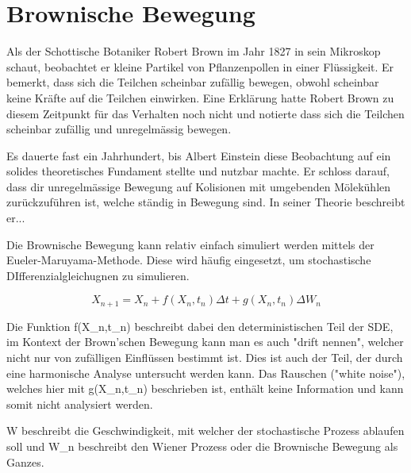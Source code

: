 %
%
%
%
\section{Brownische Bewegung\label{brown:section:teil0}}

Als der Schottische Botaniker Robert Brown im Jahr 1827 in sein Mikroskop schaut, beobachtet er kleine Partikel von Pflanzenpollen in einer Flüssigkeit. Er bemerkt, dass sich die Teilchen scheinbar zufällig bewegen, obwohl scheinbar keine Kräfte auf die Teilchen einwirken. Eine Erklärung hatte Robert Brown zu diesem Zeitpunkt für das Verhalten noch nicht und notierte dass sich die Teilchen scheinbar zufällig und unregelmässig bewegen.

Es dauerte fast ein Jahrhundert, bis Albert Einstein diese Beobachtung auf ein solides theoretisches Fundament stellte und nutzbar machte. Er schloss darauf, dass dir unregelmässige Bewegung auf Kolisionen mit umgebenden Mölekühlen zurückzuführen ist, welche ständig in Bewegung sind. In seiner Theorie beschreibt er...

Die Brownische Bewegung kann relativ einfach simuliert werden mittels der Eueler-Maruyama-Methode. Diese wird häufig eingesetzt, um stochastische DIfferenzialgleichugnen zu simulieren.

\begin{equation}
	X_{n+1} = X_n + f(X_n,t_n) \Delta t + g(X_n,t_n) \Delta W_n
\end{equation}

Die Funktion f(X_n,t_n) beschreibt dabei den deterministischen Teil der SDE, im Kontext der Brown'schen Bewegung kann man es auch "drift nennen", welcher nicht nur von zufälligen Einflüssen bestimmt ist. Dies ist auch der Teil, der durch eine harmonische Analyse untersucht werden kann. Das Rauschen ("white noise"), welches hier mit g(X_n,t_n) beschrieben ist, enthält keine Information und kann somit nicht analysiert werden.

\Delta W beschreibt die Geschwindigkeit, mit welcher der stochastische Prozess ablaufen soll und W_n beschreibt den Wiener Prozess oder die Brownische Bewegung als Ganzes.

